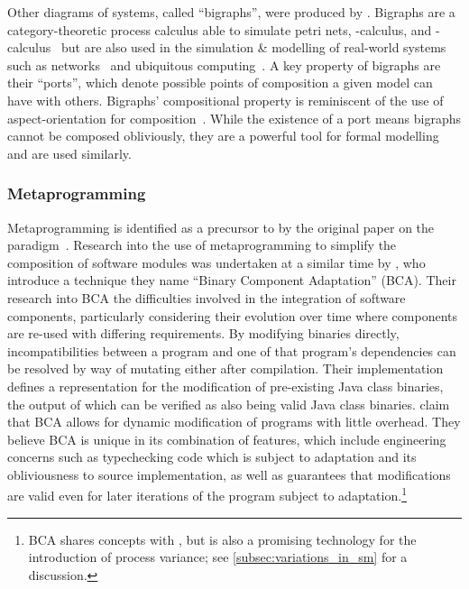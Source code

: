 Other diagrams of systems, called ``bigraphs'', were produced by
\citet{bigraphs_and_their_algebra}. Bigraphs are a category-theoretic process
calculus able to simulate petri nets, \pi{}-calculus, and
\lambda{}-calculus~\cite{space_and_motion_of_communicating_agents} but are also
used in the simulation \& modelling of real-world systems such as
networks~\cite{bigraph_network_model} and ubiquitous
computing~\cite{bigraph_lions_impalas}. A key property of bigraphs are their
``ports'', which denote possible points of composition a given model can have
with others. Bigraphs' compositional property is reminiscent of the use of
aspect-orientation for composition~\cite{gulyas1999use,Cieslak_2011}. While the
existence of a port means bigraphs cannot be composed obliviously, they are a
powerful tool for formal modelling and are used similarly.



\subsubsection{Metaprogramming}\label{metaprogramming_as_an_aop_alternative}

Metaprogramming is identified as a precursor to \aspectorientation{} by the
original paper on the paradigm~\cite{kiczales1997aspect}. Research into the use
of metaprogramming to simplify the composition of software modules was
undertaken at a similar time by \citet{keller1998binary}, who introduce a
technique they name ``Binary Component Adaptation'' (BCA). Their research into
BCA the difficulties involved in the integration of software components,
particularly considering their evolution over time where components are re-used
with differing requirements. By modifying binaries directly, incompatibilities
between a program and one of that program's dependencies can be resolved by way
of mutating either after compilation. Their implementation defines a
representation for the modification of pre-existing Java class binaries, the
output of which can be verified as also being valid Java class binaries.
 claim that BCA allows for dynamic modification of
programs with little overhead. They believe BCA is unique in its combination of
features, which include engineering concerns such as typechecking code which is
subject to adaptation and its obliviousness to source implementation, as well as
guarantees that modifications are valid even for later iterations of the program
subject to adaptation.\footnote{BCA shares concepts with \aspectorientation{}, but
  is also a promising technology for the introduction of process variance; see
  \cref{subsec:variations_in_sm} for a discussion.}

